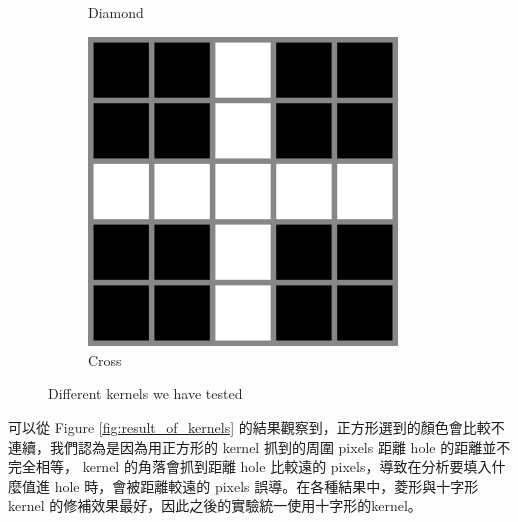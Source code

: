 \documentclass{article}
\begin{document}
\begin{CJK*}{UTF8}{bkai}
\begin{figure}[h]
\begin{subfigure}{.3\textwidth}
        \caption{Diamond}
    \end{subfigure}
    \begin{subfigure}{.3\textwidth}
        \centering
        \includegraphics[width=0.9\textwidth]{imgs/CROSS.png}
        \caption{Cross}
    \end{subfigure}
    \caption{Different kernels we have tested}
    \label{fig:dilation_kernel}
\end{figure}

可以從 Figure \ref{fig:result_of_kernels} 的結果觀察到，正方形選到的顏色會比較不連續，我們認為是因為用正方形的 kernel 抓到的周圍 pixels 距離 hole 的距離並不完全相等， kernel 的角落會抓到距離 hole 比較遠的 pixels，導致在分析要填入什麼值進 hole 時，會被距離較遠的 pixels 誤導。在各種結果中，菱形與十字形 kernel 的修補效果最好，因此之後的實驗統一使用十字形的kernel。


\end{CJK*}
\end{document}
